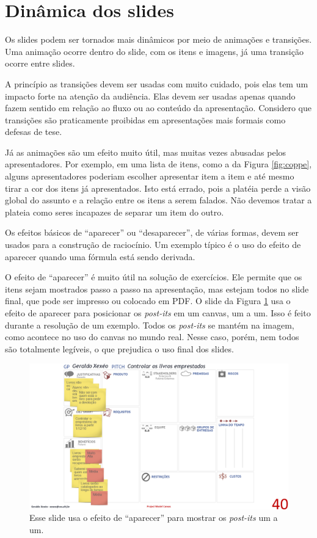 \section{Dinâmica dos slides}
\label{sec:din}

Os slides podem ser tornados mais dinâmicos por meio de animações e transições. Uma animação ocorre dentro do slide, com os itens e imagens, já uma transição ocorre entre slides.

A princípio as transições devem ser usadas com muito cuidado, pois elas tem um impacto forte na atenção da audiência. Elas devem ser usadas apenas quando fazem sentido em relação ao fluxo ou ao conteúdo da apresentação. Considero que transições são praticamente proibidas em apresentações mais formais como defesas de tese.

Já as animações são um efeito muito útil, mas muitas vezes abusadas pelos apresentadores. Por exemplo, em uma lista de itens, como a da Figura \ref{fig:coppe}, alguns apresentadores poderiam escolher apresentar item a item e até mesmo tirar a cor dos itens já apresentados. Isto está errado, pois a platéia perde a visão global do assunto e a relação entre os itens a serem falados. Não devemos tratar a plateia como seres incapazes de separar um item do outro.

Os efeitos  básicos de ``aparecer'' ou ``desaparecer'', de várias formas, devem ser usados para a construção de raciocínio. Um exemplo típico é o uso do efeito de aparecer quando uma fórmula está sendo derivada.

O efeito de ``aparecer'' é muito útil na solução de exercícios. Ele permite que os itens sejam mostrados passo a passo na apresentação, mas estejam todos no slide final, que pode ser impresso ou colocado em PDF. O slide da Figura \ref{fig:canvas} usa o efeito de aparecer para posicionar os \textit{post-its} em um canvas, um a um. Isso é feito durante a resolução de um exemplo. Todos os \textit{post-its} se mantém na imagem, como acontece no uso do canvas no mundo real. Nesse caso, porém, nem todos são totalmente legíveis, o que prejudica o uso final dos slides.


\begin{figure}[htb]
    \centering
    \includegraphics[width=\tam\linewidth,frame]{imagens/canvas}
    \caption{Esse slide usa o efeito de ``aparecer'' para mostrar os \textit{post-its} um a um.}
    \label{fig:canvas}
\end{figure}



